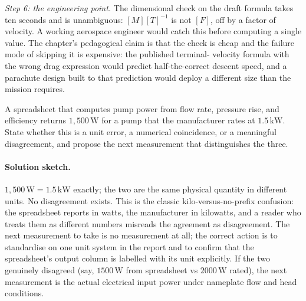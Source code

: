 \begin{exercise}
\emph{Step 6: the engineering point.} The dimensional check on the
draft formula takes ten seconds and is unambiguous: $[M][T]^{-1}$
is not $[F]$, off by a factor of velocity. A working aerospace
engineer would catch this before computing a single value. The
chapter's pedagogical claim is that the check is cheap and the
failure mode of skipping it is expensive: the published terminal-
velocity formula with the wrong drag expression would predict
half-the-correct descent speed, and a parachute design built to
that prediction would deploy a different size than the mission
requires.
\end{exercise}

\begin{exercise}
A spreadsheet that computes pump power from flow rate, pressure
rise, and efficiency returns $1{,}500 \,\si{\watt}$ for a pump that
the manufacturer rates at $1.5 \,\si{\kilo\watt}$. State whether
this is a unit error, a numerical coincidence, or a meaningful
disagreement, and propose the next measurement that distinguishes
the three.

\paragraph{Solution sketch.}
$1{,}500 \,\si{\watt} = 1.5 \,\si{\kilo\watt}$ exactly; the two are
the same physical quantity in different units. No disagreement
exists. This is the classic kilo-versus-no-prefix confusion: the
spreadsheet reports in watts, the manufacturer in kilowatts, and a
reader who treats them as different numbers misreads the agreement
as disagreement. The next measurement to take is no measurement at
all; the correct action is to standardise on one unit system in the
report and to confirm that the spreadsheet's output column is
labelled with its unit explicitly. If the two genuinely disagreed
(say, $1500 \,\si{\watt}$ from spreadsheet vs $2000 \,\si{\watt}$
rated), the next measurement is the actual electrical input power
under nameplate flow and head conditions.
\end{exercise}

